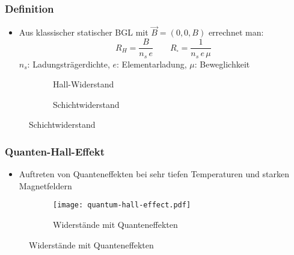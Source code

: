 \documentclass{beamer}
\begin{document}
\begin{frame}
    \frametitle{Definition}
\begin{itemize}
    \item Aus klassischer statischer BGL mit $\vec{B} = (0,0,B)$ errechnet man:
          \[R_H = \frac{B}{n_s \, e} \qquad R_\square = \frac{1}{n_s \, e \, \mu}\]
          $n_s$: Ladungsträgerdichte, $e$: Elementarladung, $\mu$: Beweglichkeit
\end{itemize}
\begin{figure}
    \begin{subfigure}[c]{0.45\textwidth}
        \caption{Hall-Widerstand}
    \end{subfigure}
    \begin{subfigure}[c]{0.45\textwidth}
        \caption{Schichtwiderstand}
    \end{subfigure}
\end{figure}
\end{frame}

\begin{frame}
    \frametitle{Quanten-Hall-Effekt}
\begin{itemize}
    \item Auftreten von Quanteneffekten bei sehr tiefen Temperaturen und starken
          Magnetfeldern
\end{itemize}
\begin{figure}
    \begin{subfigure}[c]{0.6\textwidth}
        \texttt{[image: quantum-hall-effect.pdf]}
        \caption{Widerstände mit Quanteneffekten}
    \end{subfigure}
\end{figure}
\end{frame}
\end{document}
